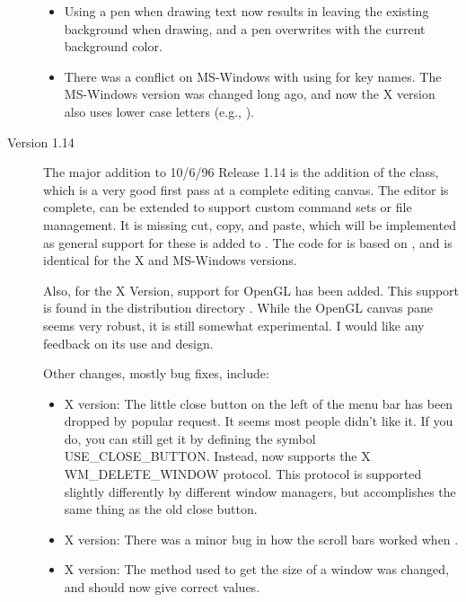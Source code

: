 \begin{description}
\begin{itemize}
\item Using a  pen when drawing text
now results in leaving the existing background when drawing, and
a  pen overwrites with the current background
color.

\item There was a conflict on MS-Windows with using  for
key names. The MS-Windows version was changed long ago, and now
the X version also uses lower case letters (e.g., ).


\end{itemize}

\item[Version 1.14]

The major addition to 10/6/96 \V Release 1.14 is the addition of
the  class, which is a very good first pass at
a complete editing canvas. The editor is complete, can be
extended to support custom command sets or file management.
It is missing cut, copy, and paste, which will be implemented
as general support for these is added to \V. The code for
 is based on , and
is identical for the X and MS-Windows versions.

Also, for the X Version, support for OpenGL has been added.
This support is found in the distribution directory
. While the \V OpenGL canvas pane seems
very robust, it is still somewhat experimental. I would
like any feedback on its use and design.

Other changes, mostly bug fixes, include:

\begin{itemize}

\item X version: The little close button on the left of the
menu bar has been dropped by popular request. It seems most people
didn't like it. If you do, you can still get it by defining
the symbol USE\_CLOSE\_BUTTON. Instead, \V now supports the
X WM\_DELETE\_WINDOW protocol. This protocol is supported
slightly differently by different window managers, but
accomplishes the same thing as the old close button.

\item X version: There was a minor bug in how the
scroll bars worked when .

\item X version: The method used to get the size of a window
was changed, and should now give correct values.


\end{itemize}
\end{description}
